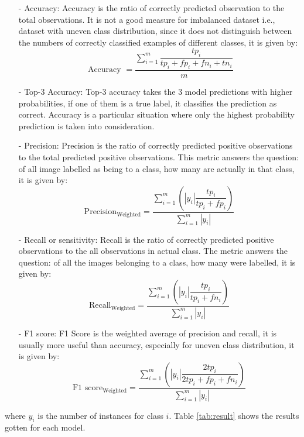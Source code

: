 \documentclass[12pt]{report}
\numberwithin{equation}{section}
\begin{document}
\begin{itemize}
\item[-] Accuracy: Accuracy is the ratio of correctly predicted observation to the total observations. It is not a good measure for imbalanced dataset i.e., dataset with uneven class distribution, since it does not distinguish between the numbers of correctly classified examples of different classes, it is given by:
\begin{equation}\label{eqn:acccuracy}
\text { Accuracy }= \displaystyle \frac{\sum_{i=1}^{m} \dfrac{tp_{i}}{tp_{i} + fp_{i} + fn_{i} + tn_{i}}}{m}
\end{equation}

\item[-] Top-3 Accuracy: Top-3 accuracy takes the $3$ model predictions with higher probabilities, if one of them is a true label, it classifies the prediction as correct. Accuracy is a particular situation where only the highest probability prediction is taken into consideration.

\item[-] Precision: Precision is the ratio of correctly predicted positive observations to the total predicted positive observations. This metric answers the question: of all image labelled as being to a class, how many are actually in that class, it is given by:
\begin{equation}\label{eqn:precision}
\text{Precision}_{\text{Weighted}} = \displaystyle \frac{\sum_{i=1}^{m}\left(\left|y_{i}\right| \dfrac{tp_{i}}{tp_{i} + fp_{i}}\right)}{\sum_{i=1}^{m}\left|y_{i}\right|}  
\end{equation}

\item[-]  Recall or sensitivity: Recall is the ratio of correctly predicted positive observations to the all observations in actual class. The metric answers the question: of all the images belonging to a class, how many were labelled, it is given by:
\begin{equation}\label{eqn:recall}
\text{Recall}_{\text{Weighted}} = \displaystyle \frac{\sum_{i=1}^{m}\left(\left|y_{i}\right| \dfrac{tp_{i}}{tp_{i} + fn_{i}}\right)}{\sum_{i=1}^{m}\left|y_{i}\right|} 
\end{equation}

\item[-] F1 score: F1 Score is the weighted average of precision and recall, it is usually more useful than accuracy, especially for uneven class distribution, it is given by:
\begin{equation}\label{eqn:f1-score}
\text {F1 score}_{\text {Weighted}} = \displaystyle \frac{\sum_{i=1}^{m}\left(\left|y_{i}\right| \dfrac{2 tp_{i}}{2 tp_{i} + fp_{i} + fn_{i}}\right)}{\sum_{i=1}^{m}\left|y_{i}\right|}
\end{equation}
\end{itemize} \noindent 
where $y_i$ is the number of instances for class $i$. Table \ref{tab:result} shows the results gotten for each model. 
\end{document}
